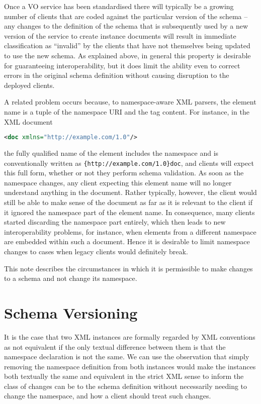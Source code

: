 \documentclass[10pt,a4paper]{ivoa}
\begin{document}
Once a VO service has been standardised there will typically be a growing number
of clients that are coded against the particular version of the
schema -- any changes to the definition of the schema that is subsequently used
by a new version of the service to create instance documents will result in
immediate classification as ``invalid'' by the clients that have not themselves being
updated to use the new schema.
As explained above, in general this property is desirable for guaranteeing interoperability, but it does limit
the ability even to correct errors in the original schema definition without
causing disruption to the deployed clients. 

A related problem occurs because, to namespace-aware XML parsers, the
element name is a tuple of the namespace URI and the tag content.  For
instance, in the XML document

\begin{lstlisting}[language=XML]
<doc xmlns="http://example.com/1.0"/>
\end{lstlisting}
the fully qualified name of the element includes the namespace and is
conventionally written as \verb|{http://example.com/1.0}doc|, and clients will expect this full
form, whether or not they perform schema validation.  As soon as the
namespace changes, any client expecting this element name will no longer
understand anything in the document.  Rather typically, however, the
client would still be able to make sense of the document as far as it is
relevant to the client if it ignored the namespace part of the element
name.  In consequence, many clients started discarding the namespace
part entirely, which then leads to new interoperability problems, for
instance, when elements from a different namespace are embedded within
such a document.  Hence it is desirable to limit namespace changes to
cases when legacy clients would definitely break.

This note describes the
circumstances in which it is permissible to make changes to a schema and not
change its namespace.


\section{Schema Versioning}
It is the case that two XML instances are formally regarded by XML
conventions as not equivalent if the only textual difference between them is
that the namespace declaration is not the same. We
can use the observation that simply removing the namespace definition from both instances
would make the instances both textually the same and equivalent in the strict
XML sense to inform the class of changes can be to the schema definition without
necessarily needing to change the namespace, and how a client should treat such
changes.
\end{document}
